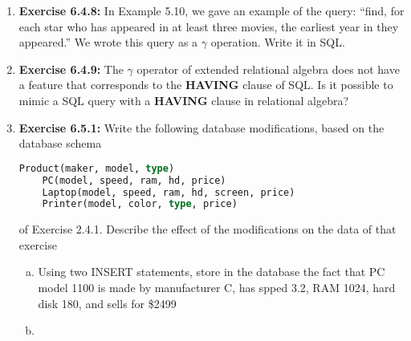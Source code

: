 \documentclass[12pt]{article}
\begin{document}
\begin{enumerate}[1.]
    \item \textbf{Exercise 6.4.8:} In Example 5.10, we gave an example of the query:
    ``find, for each star who has appeared in at least three movies, the earliest year
    in they appeared.'' We wrote this query as a $\gamma$ operation. Write it in SQL.

    \item \textbf{Exercise 6.4.9:} The $\gamma$ operator of extended relational algebra
    does not have a feature that corresponds to the \textbf{HAVING} clause of SQL.
    Is it possible to mimic a SQL query with a \textbf{HAVING} clause in relational
    algebra?

    \item \textbf{Exercise 6.5.1:} Write the following database modifications, based on the
    database schema

    \begin{lstlisting}[language=SQL]
    Product(maker, model, type)
    PC(model, speed, ram, hd, price)
    Laptop(model, speed, ram, hd, screen, price)
    Printer(model, color, type, price)
    \end{lstlisting}

    \bigskip

    of Exercise 2.4.1. Describe the effect of the modifications on the data of that
    exercise

    \begin{enumerate}[a)]
        \item Using two INSERT statements, store in the database the fact that PC
        model 1100 is made by manufacturer C, has spped 3.2, RAM 1024, hard disk 180,
        and sells for \$2499
        \item
    \end{enumerate}
\end{enumerate}
\end{document}
